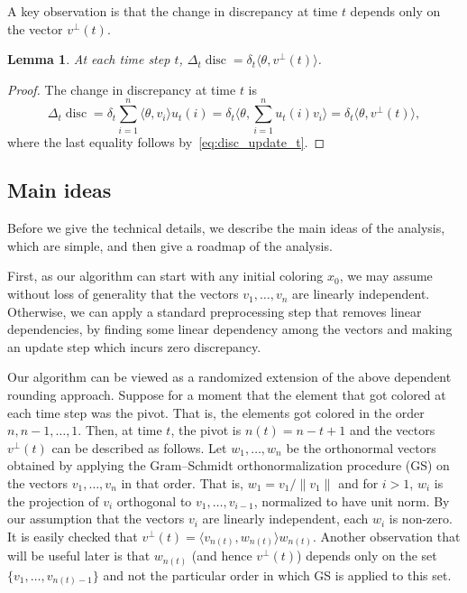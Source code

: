 \documentclass[11pt]{article}
\numberwithin{equation}{section}
\newtheorem{lemma}[theorem]{Lemma}
\theoremstyle{definition}
\theoremstyle{plain}
\DeclareMathOperator{\disc}{disc}   %
\begin{document}
A key observation is that the change in discrepancy at time $t$ depends only on
the vector $v^{\perp}(t)$.


\begin{lemma}
\label{lem:changedisc} At each time step $t$, $\Delta_t \disc = \delta_t \langle \theta, v^{\perp}(t)\rangle$.
\end{lemma}
\begin{proof}
The change in discrepancy at time $t$ is
\[\Delta_t \disc = \delta_t \sum_{i=1}^n \langle \theta,v_i \rangle u_t(i) =
\delta_t \langle \theta,  \sum_{i=1}^n u_t(i)v_i \rangle = \delta_t \langle
\theta, v^\perp(t) \rangle,
\]
where the last equality follows by~\eqref{eq:disc_update_t}.
\end{proof}


\subsection{Main ideas}
\label{sec:mainideas}

Before we give the technical details, we describe the main ideas of the analysis, which are simple, and then give a roadmap of the analysis.

First, as our algorithm can start with any initial coloring $x_0$, we may assume without loss of generality that the vectors $v_1,\ldots,v_n$ are linearly independent.
Otherwise, we can apply a standard preprocessing step that removes linear dependencies, by finding some linear dependency among the vectors and
making an update step which incurs zero discrepancy.

 Our algorithm can be viewed as a randomized extension of the above dependent rounding approach.
Suppose for a moment that the element that got colored at each time step was the pivot. That is, the elements got colored in the order $n,n-1,\ldots,1$. Then, at time $t$, the pivot is $n(t) = n-t+1$ and the vectors $v^{\perp}(t)$
can be described as follows. Let $w_1,\ldots,w_n$ be the orthonormal vectors
obtained by applying the Gram--Schmidt orthonormalization procedure (GS) on the vectors $v_1,\ldots,v_n$ in that order. That is, $w_1=v_1/\|v_1\|$ and for $i>1$, $w_i$ is the projection
of $v_i$ orthogonal to $v_1,\ldots,v_{i-1}$, normalized to have unit norm.
By our assumption that
the  %
vectors $v_i$ are linearly %
independent, each $w_i$ is non-zero. It is easily checked that $v^{\perp}(t) =
 \langle v_{n(t)},w_{n(t)} \rangle w_{n(t)}$.  Another observation that will be
useful later is that $w_{n(t)}$ (and hence $v^{\perp}(t)$) depends only on the
set $\{v_1,\ldots,v_{n(t)-1}\}$ and not the particular order in which GS is
applied to this set.
\end{document}
